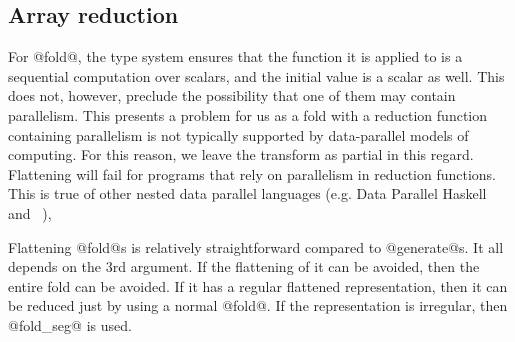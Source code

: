 \subsection{Array reduction}
For @fold@, the type system ensures that the function it is applied to is a sequential computation over scalars, and the initial value is a scalar as well. This does not, however, preclude the possibility that one of them may contain parallelism. This presents a problem for us as a fold with a reduction function containing parallelism is not typically supported by data-parallel models of computing. For this reason, we leave the transform as partial in this regard. Flattening will fail for programs that rely on parallelism in reduction functions. This is true of other nested data parallel languages (e.g. Data Parallel Haskell~\cite{Chakravarty:DPH} and \nesl~\cite{Blelloch:nesl1995}),

Flattening @fold@s is relatively straightforward compared to @generate@s. It all depends on the 3rd argument. If the flattening of it can be avoided, then the entire fold can be avoided. If it has a regular flattened representation, then it can be reduced just by using a normal @fold@. If the representation is irregular, then @fold_seg@ is used.



